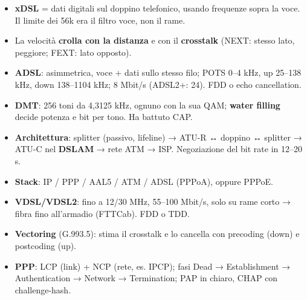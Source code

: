 \begin{itemize}
\tightlist
\item
  \textbf{xDSL} = dati digitali sul doppino telefonico, usando frequenze sopra la voce. Il limite dei 56k era il filtro voce, non il rame.
\item
  La velocità \textbf{crolla con la distanza} e con il \textbf{crosstalk} (NEXT: stesso lato, peggiore; FEXT: lato opposto).
\item
  \textbf{ADSL}: asimmetrica, voce + dati sullo stesso filo; POTS 0--4 kHz, up 25--138 kHz, down 138--1104 kHz; 8 Mbit/s (ADSL2+: 24). FDD o echo cancellation.
\item
  \textbf{DMT}: 256 toni da 4,3125 kHz, ognuno con la sua QAM; \textbf{water filling} decide potenza e bit per tono. Ha battuto CAP.
\item
  \textbf{Architettura}: splitter (passivo, lifeline) → ATU-R ↔ doppino ↔ splitter → ATU-C nel \textbf{DSLAM} → rete ATM → ISP. Negoziazione del bit rate in 12--20 s.
\item
  \textbf{Stack}: IP / PPP / AAL5 / ATM / ADSL (PPPoA), oppure PPPoE.
\item
  \textbf{VDSL/VDSL2}: fino a 12/30 MHz, 55--100 Mbit/s, solo su rame corto → fibra fino all'armadio (FTTCab). FDD o TDD.
\item
  \textbf{Vectoring} (G.993.5): stima il crosstalk e lo cancella con precoding (down) e postcoding (up).
\item
  \textbf{PPP}: LCP (link) + NCP (rete, es. IPCP); fasi Dead → Establishment → Authentication → Network → Termination; PAP in chiaro, CHAP con challenge-hash.
\end{itemize}
